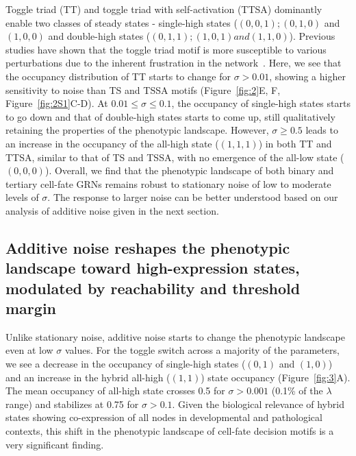 \documentclass[11pt]{article}
\begin{document}
Toggle triad (TT) and toggle triad with self-activation (TTSA) dominantly enable two classes of steady states - single-high states ($(0, 0, 1); (0, 1, 0)$ and $(1, 0, 0)$ and double-high states ($(0, 1, 1); (1, 0, 1) and (1, 1, 0)$). Previous studies have shown that the toggle triad motif is more susceptible to various perturbations due to the inherent frustration in the network~\cite{harlapur2022functional, doi:10.1098/rsif.2020.0631}. Here, we see that the occupancy distribution of TT starts to change for $\sigma > 0.01$, showing a higher sensitivity to noise than TS and TSSA motifs (Figure~\ref{fig:2}E, F, Figure~\ref{fig:2S1}C-D). At $0.01 \leq \sigma \leq 0.1$, the occupancy of single-high states starts to go down and that of double-high states starts to come up, still qualitatively retaining the properties of the phenotypic landscape. However, $\sigma \geq 0.5$ leads to an increase in the occupancy of the all-high state ($(1, 1, 1)$) in both TT and TTSA, similar to that of TS and TSSA, with no emergence of the all-low state ($(0, 0, 0)$). Overall, we find that the phenotypic landscape of both binary and tertiary cell-fate GRNs remains robust to stationary noise of low to moderate levels of $\sigma$. The response to larger noise can be better understood based on our analysis of additive noise given in the next section. 


\subsection{Additive noise reshapes the phenotypic landscape toward high-expression states, modulated by reachability and threshold margin}

Unlike stationary noise, additive noise starts to change the phenotypic landscape even at low $\sigma$ values. For the toggle switch across a majority of the parameters, we see a decrease in the occupancy of single-high states ($(0, 1)$ and $(1, 0)$) and an increase in the hybrid all-high ($(1, 1)$) state occupancy (Figure~\ref{fig:3}A). The mean occupancy of all-high state crosses 0.5 for $\sigma > 0.001$ (0.1\% of the $\lambda$ range) and stabilizes at 0.75 for $\sigma > 0.1$. Given the biological relevance of hybrid states showing co-expression of all nodes in developmental and pathological contexts, this shift in the phenotypic landscape of cell-fate decision motifs is a very significant finding. 
\end{document}
